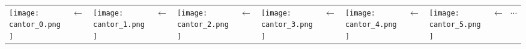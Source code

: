 \documentclass[pdftex, 10pt]{amsart}
\begin{document}
\begin{longtable}{m{5mm}m{5mm}m{5mm}m{5mm}m{5mm}m{5mm}m{5mm}m{5mm}m{5mm}m{5mm}m{5mm}m{2cm}}
	\texttt{[image: cantor\_0.png]} &
	$\leftarrow$ &
	\texttt{[image: cantor\_1.png]} &
	$\leftarrow$ &
	\texttt{[image: cantor\_2.png]} &
	$\leftarrow$ &
	\texttt{[image: cantor\_3.png]} &
	$\leftarrow$ &
	\texttt{[image: cantor\_4.png]} &
	$\leftarrow$ &
	\texttt{[image: cantor\_5.png]} &
	$\leftarrow \ \ \ \cdots$
\end{longtable}
\end{document}
